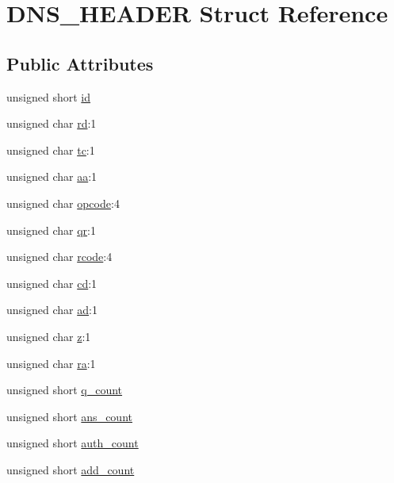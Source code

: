 \hypertarget{struct_d_n_s___h_e_a_d_e_r}{\section{D\-N\-S\-\_\-\-H\-E\-A\-D\-E\-R Struct Reference}
\label{struct_d_n_s___h_e_a_d_e_r}
}
\subsection*{Public Attributes}
\begin{DoxyCompactItemize}
\item 
unsigned short \hyperlink{struct_d_n_s___h_e_a_d_e_r_a5ac83f81b8da8ddb83e3f5baf9a51e94}{id}
\item 
unsigned char \hyperlink{struct_d_n_s___h_e_a_d_e_r_ae36057dbcab8fd192148aed912270462}{rd}\-:1
\item 
unsigned char \hyperlink{struct_d_n_s___h_e_a_d_e_r_acfd94249b1b03793d63a6b87fea41d9e}{tc}\-:1
\item 
unsigned char \hyperlink{struct_d_n_s___h_e_a_d_e_r_a0b35c4f2cf9cc0d1555afa24676c2b26}{aa}\-:1
\item 
unsigned char \hyperlink{struct_d_n_s___h_e_a_d_e_r_a07b70b04059dd68a0f7c1c879ccf1ef2}{opcode}\-:4
\item 
unsigned char \hyperlink{struct_d_n_s___h_e_a_d_e_r_a874c920bbfec9e40d6b77e97128d1da9}{qr}\-:1
\item 
unsigned char \hyperlink{struct_d_n_s___h_e_a_d_e_r_a3b7ff1e78cc57527d2afe217fd4d0178}{rcode}\-:4
\item 
unsigned char \hyperlink{struct_d_n_s___h_e_a_d_e_r_af63c835c6ea830833207e2c8e3327fbd}{cd}\-:1
\item 
unsigned char \hyperlink{struct_d_n_s___h_e_a_d_e_r_a61bfa8d857d74fb70872b179ddbe59e5}{ad}\-:1
\item 
unsigned char \hyperlink{struct_d_n_s___h_e_a_d_e_r_a4a09d9fe1ea80fcc992af0e4a90b0e6c}{z}\-:1
\item 
unsigned char \hyperlink{struct_d_n_s___h_e_a_d_e_r_ab689629314dd78eb571b9d4d82feef8a}{ra}\-:1
\item 
unsigned short \hyperlink{struct_d_n_s___h_e_a_d_e_r_a6b9815b90208910759572254bf0905e5}{q\-\_\-count}
\item 
unsigned short \hyperlink{struct_d_n_s___h_e_a_d_e_r_abf109ef7bbba2e8145177411c6835faa}{ans\-\_\-count}
\item 
unsigned short \hyperlink{struct_d_n_s___h_e_a_d_e_r_aa8c1b1d176c5ff1ab2007af10cecccf7}{auth\-\_\-count}
\item 
unsigned short \hyperlink{struct_d_n_s___h_e_a_d_e_r_a62902698d81157eba889e57f56b11702}{add\-\_\-count}
\end{DoxyCompactItemize}


